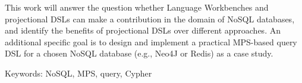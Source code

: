 {This work will answer the question whether Language Workbenches and projectional DSLs can make a
contribution in the domain of NoSQL databases, and identify the benefits of projectional DSLs over
different approaches. An additional specific goal is to design and implement a practical MPS-based
query DSL for a chosen NoSQL database (e.g., Neo4J or Redis) as a case study.

Keywords:
NoSQL, MPS, query, Cypher

\vss}